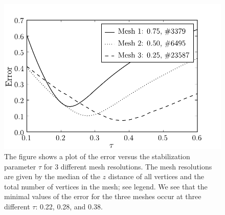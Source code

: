 \begin{figure}
  \label{fig:hake:error_plot}
  \includegraphics[width=\linewidth]{chapters/hake/pdf/error_plot}
  \caption[Error plot]{The figure shows a plot of the error versus the
    stabilization parameter $\tau$ for 3 different mesh
    resolutions. The mesh resolutions are given by the median of the
    $z$ distance of all vertices and the total number of vertices in
    the mesh; see legend. We see that the minimal values of the error
    for the three meshes occur at three different $\tau$: 0.22, 0.28,
    and 0.38.}
\end{figure}


